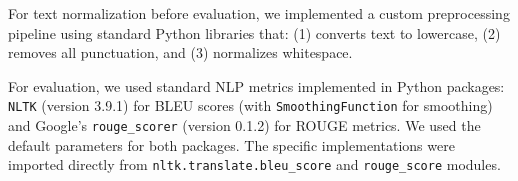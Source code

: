 For text normalization before evaluation, we implemented a custom preprocessing pipeline using standard Python libraries that: (1) converts text to lowercase, (2) removes all punctuation, and (3) normalizes whitespace.

For evaluation, we used standard NLP metrics implemented in Python packages: \texttt{NLTK} (version 3.9.1) for BLEU scores (with \texttt{SmoothingFunction} for smoothing) and Google's \texttt{rouge\_scorer} (version 0.1.2) for ROUGE metrics. We used the default parameters for both packages. The specific implementations were imported directly from \texttt{nltk.translate.bleu\_score} and \texttt{rouge\_score} modules.
